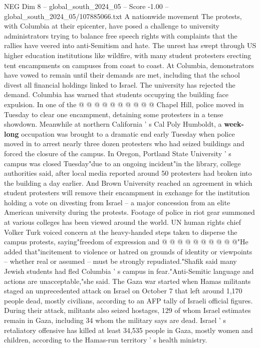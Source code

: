 \begin{textsample}{NEG Dim 8 – global\_south\_2024\_05 – Score -1.00 – global\_south\_2024\_05/107885066.txt}
A nationwide movement The protests, with Columbia at their epicenter, have posed a challenge to university administrators trying to balance free speech rights with complaints that the rallies have veered into anti-Semitism and hate.
The unrest has swept through US higher education institutions like wildfire, with many student protesters erecting tent encampments on campuses from coast to coast.
At Columbia, demonstrators have vowed to remain until their demands are met, including that the school divest all financial holdings linked to Israel.
The university has rejected the demand.
Columbia has warned that students occupying the building face expulsion.
In one of the @ @ @ @ @ @ @ @ @ @ Chapel Hill, police moved in Tuesday to clear one encampment, detaining some protesters in a tense showdown.
Meanwhile at northern California ' s Cal Poly Humboldt, a \textbf{week-long} occupation was brought to a dramatic end early Tuesday when police moved in to arrest nearly three dozen protesters who had seized buildings and forced the closure of the campus.
In Oregon, Portland State University ' s campus was closed Tuesday"due to an ongoing incident"in the library, college authorities said, after local media reported around 50 protesters had broken into the building a day earlier.
And Brown University reached an agreement in which student protesters will remove their encampment in exchange for the institution holding a vote on divesting from Israel -- a major concession from an elite American university during the protests.
Footage of police in riot gear summoned at various colleges has been viewed around the world.
UN human rights chief Volker Turk voiced concern at the heavy-handed steps taken to disperse the campus protests, saying"freedom of expression and @ @ @ @ @ @ @ @ @ @"He added that"incitement to violence or hatred on grounds of identity or viewpoints -- whether real or assumed -- must be strongly repudiated."Shafik said many Jewish students had fled Columbia ' s campus in fear."Anti-Semitic language and actions are unacceptable,"she said.
The Gaza war started when Hamas militants staged an unprecedented attack on Israel on October 7 that left around 1,170 people dead, mostly civilians, according to an AFP tally of Israeli official figures.
During their attack, militants also seized hostages, 129 of whom Israel estimates remain in Gaza, including 34 whom the military says are dead.
Israel ' s retaliatory offensive has killed at least 34,535 people in Gaza, mostly women and children, according to the Hamas-run territory ' s health ministry.

\end{textsample}
